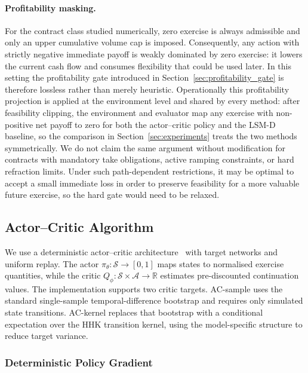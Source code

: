 \documentclass[a4paper,fleqn]{cas-dc}
\begin{document}
\paragraph{Profitability masking.}
For the contract class studied numerically, zero exercise is always admissible and only an upper cumulative volume cap is imposed. Consequently, any action with strictly negative immediate payoff is weakly dominated by zero exercise: it lowers the current cash flow and consumes flexibility that could be used later. In this setting the profitability gate introduced in Section~\ref{sec:profitability_gate} is therefore lossless rather than merely heuristic. Operationally this profitability projection is applied at the environment level and shared by every method: after feasibility clipping, the environment and evaluator map any exercise with non-positive net payoff to zero for both the actor--critic policy and the LSM-D baseline, so the comparison in Section~\ref{sec:experiments} treats the two methods symmetrically. We do not claim the same argument without modification for contracts with mandatory take obligations, active ramping constraints, or hard refraction limits. Under such path-dependent restrictions, it may be optimal to accept a small immediate loss in order to preserve feasibility for a more valuable future exercise, so the hard gate would need to be relaxed.

\subsection{Actor--Critic Algorithm}
\label{sec:actor_critic}

We use a deterministic actor--critic architecture~\cite{silver2014dpg} with target networks and uniform replay. The actor $\pi_\theta : \mathcal{S} \to [0,1]$ maps states to normalised exercise quantities, while the critic $Q_\phi : \mathcal{S} \times \mathcal{A} \to \mathbb{R}$ estimates pre-discounted continuation values. The implementation supports two critic targets. AC-sample uses the standard single-sample temporal-difference bootstrap and requires only simulated state transitions. AC-kernel replaces that bootstrap with a conditional expectation over the HHK transition kernel, using the model-specific structure to reduce target variance.

\subsubsection{Deterministic Policy Gradient}
\end{document}
